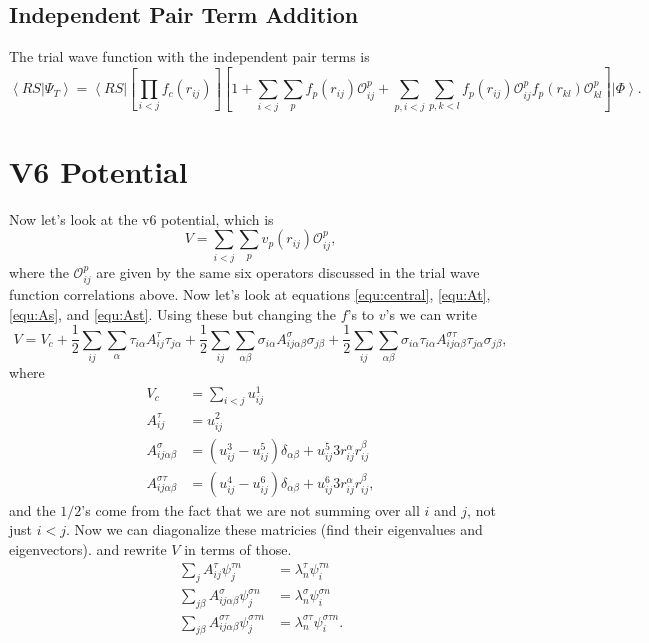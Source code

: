 \documentclass[12pt]{extarticle}
\newcommand{\Oijp}{\mathcal{O}^p_{ij}}
\newcommand{\Oklp}{\mathcal{O}^p_{kl}}
\newcommand{\ket}[1]{\left| #1 \right>}
\newcommand{\bra}[1]{\left< #1 \right|}
\newcommand{\braket}[2]{\left< #1 | #2 \right>}
\begin{document}
\subsection{Independent Pair Term Addition}
The trial wave function with the independent pair terms is
\begin{equation}
  \braket{RS}{\Psi_T} = \bra{RS} \left[ \prod_{i<j}f_c(r_{ij}) \right] \left[ 1+\sum_{i<j}\sum_p f_p(r_{ij})\Oijp + \sum_{p,i<j}\sum_{p,k<l} f_p(r_{ij})\Oijp f_p(r_{kl})\Oklp \right] \ket{\Phi}.
\end{equation}

\section{V6 Potential}
Now let's look at the v6 potential, which is
\begin{equation}
V = \sum_{i<j}\sum_p v_p(r_{ij}) \Oijp,
\end{equation}
where the $\Oijp$ are given by the same six operators discussed in the trial wave function correlations above. Now let's look at equations \ref{equ:central}, \ref{equ:At}, \ref{equ:As}, and \ref{equ:Ast}. Using these but changing the $f$'s to $v$'s we can write
\begin{equation}
V = V_c + \frac{1}{2}\sum_{ij}\sum_{\alpha}\tau_{i \alpha}A^\tau_{ij}\tau_{j \alpha} + \frac{1}{2}\sum_{ij}\sum_{\alpha \beta}\sigma_{i \alpha}A^\sigma_{ij\alpha\beta}\sigma_{j \beta} + \frac{1}{2}\sum_{ij}\sum_{\alpha \beta} \sigma_{i \alpha} \tau_{i \alpha} A^{\sigma \tau}_{ij\alpha\beta} \tau_{j \alpha}\sigma_{j \beta},
\end{equation}
where
\begin{align}
  V_c &= \sum_{i<j} u^1_{ij} \\
  A^\tau_{ij} &= u^2_{ij} \\
  A^\sigma_{ij\alpha\beta} &= (u^3_{ij}-u^5_{ij})\delta_{\alpha\beta} + u^5_{ij} 3r^\alpha_{ij} r^\beta_{ij} \\
  A^{\sigma \tau}_{ij\alpha\beta} &= (u^4_{ij}-u^6_{ij})\delta_{\alpha\beta} + u^6_{ij} 3r^\alpha_{ij} r^\beta_{ij},
\end{align}
and the $1/2$'s come from the fact that we are not summing over all $i$ and $j$, not just $i<j$. Now we can diagonalize these matricies (find their eigenvalues and eigenvectors). and rewrite $V$ in terms of those.
\begin{align}
  \sum_{j} A^\tau_{ij} \psi^{\tau n}_j &= \lambda^\tau_n \psi^{\tau n}_i \\
  \sum_{j \beta} A^\sigma_{ij\alpha\beta} \psi^{\sigma n}_j &= \lambda^\sigma_n \psi^{\sigma n}_i \\
  \sum_{j \beta} A^{\sigma\tau}_{ij\alpha\beta} \psi^{\sigma\tau n}_j &= \lambda^{\sigma\tau}_n \psi^{\sigma\tau n}_i.
\end{align}
\end{document}
